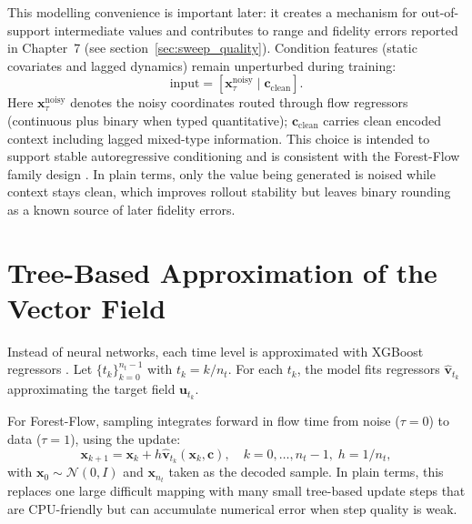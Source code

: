 This modelling convenience is important later: it creates a mechanism for out-of-support intermediate values and contributes to range and fidelity errors reported in Chapter~7 (see section~\ref{sec:sweep_quality}).
Condition features (static covariates and lagged dynamics) remain unperturbed during training:
\begin{equation}
\mathrm{input} = [\mathbf{x}_\tau^{\text{noisy}} \mid \mathbf{c}_{\text{clean}}].
\end{equation}
Here $\mathbf{x}_\tau^{\text{noisy}}$ denotes the noisy coordinates routed through flow regressors (continuous plus binary when typed quantitative); $\mathbf{c}_{\text{clean}}$ carries clean encoded context including lagged mixed-type information.
This choice is intended to support stable autoregressive conditioning and is consistent with the Forest-Flow family design \cite{jolicoeur2023forest}.
In plain terms, only the value being generated is noised while context stays clean, which improves rollout stability but leaves binary rounding as a known source of later fidelity errors.

\section{Tree-Based Approximation of the Vector Field}

Instead of neural networks, each time level is approximated with XGBoost regressors \cite{chen2016xgboost}.
Let $\{t_k\}_{k=0}^{n_t-1}$ with $t_k = k/n_t$.
For each $t_k$, the model fits regressors $\hat{\mathbf{v}}_{t_k}$ approximating the target field $\mathbf{u}_{t_k}$.

For Forest-Flow, sampling integrates forward in flow time from noise ($\tau=0$) to data ($\tau=1$), using the update:
\begin{equation}
\mathbf{x}_{k+1} = \mathbf{x}_{k} + h\hat{\mathbf{v}}_{t_k}(\mathbf{x}_{k}, \mathbf{c}), \quad k=0,\ldots,n_t-1,\; h=1/n_t,
\end{equation}
with $\mathbf{x}_0\sim\mathcal{N}(0,I)$ and $\mathbf{x}_{n_t}$ taken as the decoded sample.
In plain terms, this replaces one large difficult mapping with many small tree-based update steps that are CPU-friendly but can accumulate numerical error when step quality is weak.

